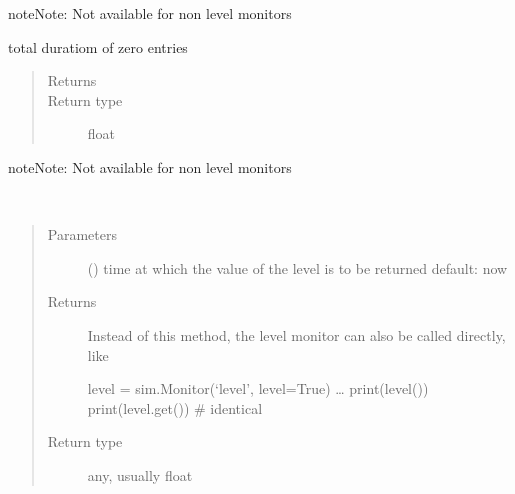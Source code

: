 \documentclass[letterpaper,10pt,english]{sphinxmanual}
\begin{document}
\begin{fulllineitems}
\begin{fulllineitems}
\begin{sphinxadmonition}{note}{Note:}
Not available for non level monitors
\end{sphinxadmonition}

\end{fulllineitems}


\begin{fulllineitems}
\label{\detokenize{Reference:salabim.Monitor.duration_zero}}
total duratiom of zero entries
\begin{quote}\begin{description}
\item[{Returns}] \leavevmode
{}

\item[{Return type}] \leavevmode
float

\end{description}\end{quote}

\begin{sphinxadmonition}{note}{Note:}
Not available for non level monitors
\end{sphinxadmonition}

\end{fulllineitems}


\begin{fulllineitems}
\label{\detokenize{Reference:salabim.Monitor.get}}~\begin{quote}\begin{description}
\item[{Parameters}] \leavevmode
{} () \textendash{} time at which the value of the level is to be returned 
default: now

\item[{Returns}] \leavevmode

 \textendash{} Instead of this method, the level monitor can also be called directly, like 

level = sim.Monitor(‘level’, level=True) 
… 
print(level()) 
print(level.get())  \# identical 


\item[{Return type}] \leavevmode
any, usually float


\end{description}
\end{quote}
\end{fulllineitems}
\end{fulllineitems}
\end{document}

